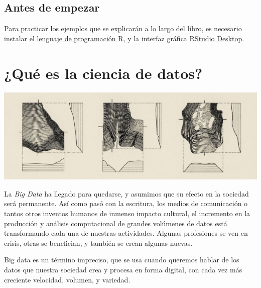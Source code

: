 \documentclass[
]{book}
\begin{document}
\hypertarget{antes-de-empezar}{%
\section*{Antes de empezar}\label{antes-de-empezar}}

Para practicar los ejemplos que se explicarán a lo largo del libro, es necesario instalar el \href{https://cloud.r-project.org/}{lenguaje de programación R}, y la interfaz gráfica \href{https://www.rstudio.com/products/rstudio/download/}{RStudio Desktop}.

\hypertarget{quuxe9-es-la-ciencia-de-datos}{%
\chapter{¿Qué es la ciencia de datos?}\label{quuxe9-es-la-ciencia-de-datos}}

\includegraphics[width=1\linewidth]{imagenes/que_es_ciencia_de_datos}

La \emph{Big Data} ha llegado para quedarse, y asumimos que su efecto en la sociedad será permanente. Así como pasó con la escritura, los medios de comunicación o tantos otros inventos humanos de inmenso impacto cultural, el incremento en la producción y análisis computacional de grandes volúmenes de datos está transformando cada una de nuestras actividades. Algunas profesiones se ven en crisis, otras se benefician, y también se crean algunas nuevas.

Big data es un término impreciso, que se usa cuando queremos hablar de los datos que nuestra sociedad crea y procesa en forma digital, con cada vez más creciente velocidad, volumen, y variedad.
\end{document}
